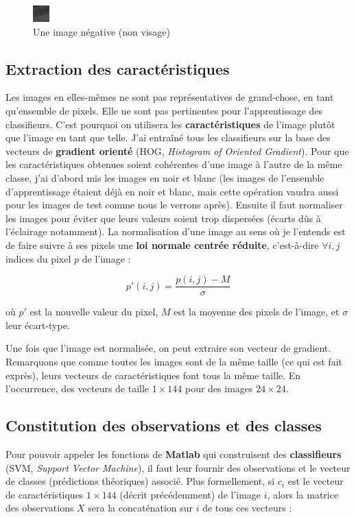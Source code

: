 \documentclass[11pt]{report}
\begin{document}
\begin{figure}[h]
\centering
\includegraphics{image/neg.png}
\cprotect\caption{Une image négative (non visage)}
\end{figure}

\subsection*{Extraction des caractéristiques}

Les images en elles-mêmes ne sont pas représentatives de grand-chose, en tant qu'ensemble de pixels. Elle ne sont pas pertinentes pour l'apprentissage des classifieurs. C'est pourquoi on utilisera les \textbf{caractéristiques} de l'image plutôt que l'image en tant que telle. J'ai entraîné tous les classifieurs sur la base des vecteurs de \textbf{gradient orienté} (HOG, \textit{Histogram of Oriented Gradient}). Pour que les caractéristiques obtenues soient cohérentes d'une image à l'autre de la même classe, j'ai d'abord mis les images en noir et blanc (les images de l'ensemble d'apprentissage étaient déjà en noir et blanc, mais cette opération vaudra aussi pour les images de test comme nous le verrons après). Ensuite il faut normaliser les images pour éviter que leurs valeurs soient trop dispersées (écarts dûs à l'éclairage notamment). La normalisation d'une image au sens où je l'entends est de faire suivre à ses pixels une \textbf{loi normale centrée réduite}, c'est-à-dire $\forall i,j$ indices du pixel $p$ de l'image : 

$$
p'(i, j) = \frac{p(i, j) - M}{\sigma}
$$

où $p'$ est la nouvelle valeur du pixel, $M$ est la moyenne des pixels de l'image, et $\sigma$ leur écart-type.

Une fois que l'image est normalisée, on peut extraire son vecteur de gradient. Remarquons que comme toutes les images sont de la même taille (ce qui est fait exprès), leurs vecteurs de caractéristiques font tous la même taille. En l'occurrence, des vecteurs de taille $1 \times 144$ pour des images $24 \times 24$.

\subsection*{Constitution des observations et des classes}

Pour pouvoir appeler les fonctions de \textbf{Matlab} qui construisent des \textbf{classifieurs} (SVM, \textit{Support Vector Machine}), il faut leur fournir des observations et le vecteur de classes (prédictions théoriques) associé. Plus formellement, si $c_{i}$ est le vecteur de caractéristiques $1 \times 144$ (décrit précédemment) de l'image $i$, alors la matrice des observations $X$ sera la concaténation sur $i$ de tous ces vecteurs :
\end{document}
